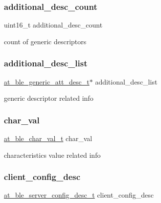 \subsubsection{\texorpdfstring{additional\_desc\_count}{additional\_desc\_count}}
{\footnotesize\ttfamily uint16\+\_\+t additional\+\_\+desc\+\_\+count}

count of generic descriptors \mbox{\label{structat__ble__chr__t_a5557b3c83aed820e5d9e6d41fef8efa1}} 
\subsubsection{\texorpdfstring{additional\_desc\_list}{additional\_desc\_list}}
{\footnotesize\ttfamily \mbox{\hyperlink{structat__ble__generic__att__desc__t}{at\+\_\+ble\+\_\+generic\+\_\+att\+\_\+desc\+\_\+t}}$\ast$ additional\+\_\+desc\+\_\+list}

generic descriptor related info \mbox{\label{structat__ble__chr__t_a4c759424b3f047850343c1d8264fe5a4}} 
\subsubsection{\texorpdfstring{char\_val}{char\_val}}
{\footnotesize\ttfamily \mbox{\hyperlink{structat__ble__char__val__t}{at\+\_\+ble\+\_\+char\+\_\+val\+\_\+t}} char\+\_\+val}

characteristics value related info \mbox{\label{structat__ble__chr__t_a990049f9e3e094e466ec870e5385ab57}} 
\subsubsection{\texorpdfstring{client\_config\_desc}{client\_config\_desc}}
{\footnotesize\ttfamily \mbox{\hyperlink{structat__ble__server__config__desc__t}{at\+\_\+ble\+\_\+server\+\_\+config\+\_\+desc\+\_\+t}} client\+\_\+config\+\_\+desc}

